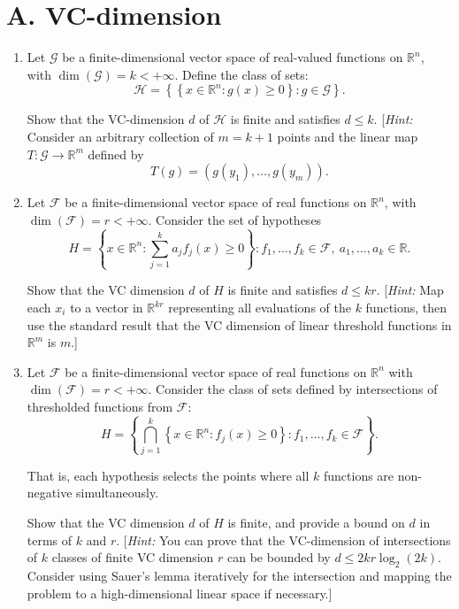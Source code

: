 \documentclass[letterpaper, 11pt]{article}
\newcommand{\1}{\mathds{1}}	%
\theoremstyle{definition}
\begin{document}
\section*{A. VC-dimension}

\begin{enumerate}
\item Let $\mathcal{G}$ be a finite-dimensional vector space of real-valued functions on $\mathbb{R}^n$, with $\dim(\mathcal{G}) = k < +\infty$. Define the class of sets:
\[
\mathcal{H} = \left\{\left\{x \in \mathbb{R}^n: g(x) \geq 0\right\}: g \in \mathcal{G}\right\}.
\]

Show that the VC-dimension $d$ of $\mathcal{H}$ is finite and satisfies $d \leq k$. [\textit{Hint:} Consider an arbitrary collection of $m = k + 1$ points and the linear map $T: \mathcal{G} \to \mathbb{R}^m$ defined by
\[
T(g) = (g(y_1), \ldots, g(y_m)).
\]

\item Let $\mathcal{F}$ be a finite-dimensional vector space of real functions on $\mathbb{R}^n$, with $\dim(\mathcal{F}) = r < +\infty$. Consider the set of hypotheses
\[
H = \left\{x \in \mathbb{R}^n: \sum_{j=1}^k a_j f_j(x) \geq 0\right\}: f_1, \ldots, f_k \in \mathcal{F}, \ a_1, \ldots, a_k \in \mathbb{R}.
\]

Show that the VC dimension $d$ of $H$ is finite and satisfies $d \leq kr$. [\textit{Hint:} Map each $x_i$ to a vector in $\mathbb{R}^{kr}$ representing all evaluations of the $k$ functions, then use the standard result that the VC dimension of linear threshold functions in $\mathbb{R}^m$ is $m$.]

\item Let $\mathcal{F}$ be a finite-dimensional vector space of real functions on $\mathbb{R}^n$ with $\dim(\mathcal{F}) = r < +\infty$. Consider the class of sets defined by intersections of thresholded functions from $\mathcal{F}$:
\[
H = \left\{\bigcap_{j=1}^k \left\{x \in \mathbb{R}^n: f_j(x) \geq 0\right\}: f_1, \ldots, f_k \in \mathcal{F}\right\}.
\]

That is, each hypothesis selects the points where all $k$ functions are non-negative simultaneously.

Show that the VC dimension $d$ of $H$ is finite, and provide a bound on $d$ in terms of $k$ and $r$. [\textit{Hint:} You can prove that the VC-dimension of intersections of $k$ classes of finite VC dimension $r$ can be bounded by $d \leq 2kr \log_2(2k)$. Consider using Sauer's lemma iteratively for the intersection and mapping the problem to a high-dimensional linear space if necessary.]
\end{enumerate}
\end{document}
